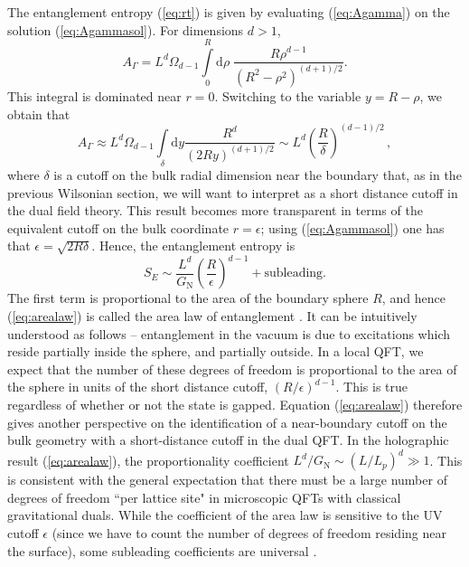 \documentclass[10pt, oneside]{book}
\begin{document}
\begin{doublespace}
The entanglement entropy (\ref{eq:rt}) is given by evaluating (\ref{eq:Agamma}) on the solution (\ref{eq:Agammasol}).  For dimensions $d>1$,
\begin{equation}
A_\Gamma = L^d\Omega_{d-1} \int\limits_0^{R} \mathrm{d}\rho \; \frac{R\rho^{d-1}}{(R^2-\rho^2)^{(d+1)/2}}.
\end{equation}
This integral is dominated near $r=0$. Switching to the variable $y = R-\rho$, we obtain that
\begin{equation}
A_\Gamma \approx L^d\Omega_{d-1} \int\limits_\delta  \mathrm{d}y \frac{R^d}{(2Ry)^{(d+1)/2}} \sim L^d \left(\frac{R}{\delta}\right)^{(d-1)/2} \,,
\end{equation}
where $\delta$ is a cutoff on the bulk radial dimension near the boundary that, as in the previous Wilsonian section, we will want to interpret as a short distance cutoff in the dual field theory. This result becomes more transparent in terms of the equivalent cutoff on the bulk coordinate $r=\epsilon$; using (\ref{eq:Agammasol}) one has that  $\epsilon = \sqrt{2R\delta}$.  Hence, the entanglement entropy is
\begin{equation}
S_E \sim \frac{L^d}{G_{\mathrm{N}}} \left(\frac{R}{\epsilon}\right)^{d-1} + \text{subleading}.  \label{eq:arealaw}
\end{equation}
The first term is proportional to the area of the boundary sphere $R$, and hence (\ref{eq:arealaw}) is called the area law of entanglement \cite{Srednicki:1993im}.   It can be intuitively understood as follows -- entanglement in the vacuum is due to excitations which reside partially inside the sphere, and partially outside. In a local QFT, we expect that the number of these degrees of freedom is proportional to the area of the sphere in units of the short distance cutoff, $(R/\epsilon)^{d-1}$.  This is true regardless of whether or not the state is gapped. Equation (\ref{eq:arealaw}) therefore gives another perspective on the identification of a near-boundary cutoff on the bulk geometry with a short-distance cutoff in the dual QFT. In the holographic result (\ref{eq:arealaw}), the proportionality coefficient $L^d/G_{\mathrm{N}} \sim (L/L_p)^d \gg 1$. This is consistent with the general expectation that there must be a large number of degrees of freedom ``per lattice site" in microscopic QFTs with classical gravitational duals.  While the coefficient of the area law is sensitive to the UV cutoff $\epsilon$ (since we have to count the number of degrees of freedom residing near the surface),  some subleading coefficients are universal \cite{Ryu:2006ef}.


\end{doublespace}
\end{document}
